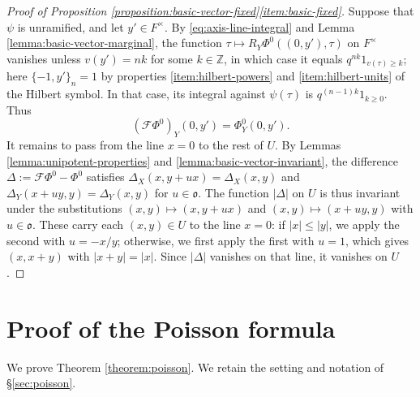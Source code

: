 \documentclass[reqno]{amsart}
\theoremstyle{plain}
\theoremstyle{definition}
\theoremstyle{itplain}
\numberwithin{equation}{section}
\numberwithin{theorem}{section}
\begin{document}
\begin{proof}[Proof of Proposition \ref{proposition:basic-vector-fixed}\eqref{item:basic-fixed}]
  Suppose that $\psi$ is unramified, and let $y' \in F^\times$.  By \eqref{eq:axis-line-integral} and Lemma \ref{lemma:basic-vector-marginal}, the function $\tau \mapsto R_Y \Phi^0((0, y'), \tau)$ on $F^\times$ vanishes unless $v(y') = n k$ for some $k \in \mathbb{Z}$, in which case it equals $q^{n k} 1_{v(\tau) \geq k}$; here $\{-1, y'\}_n = 1$ by properties \eqref{item:hilbert-powers} and \eqref{item:hilbert-units} of the Hilbert symbol.  In that case, its integral against $\psi(\tau)$ is $q^{(n-1) k} 1_{k \geq 0}$.  Thus
  \begin{equation*}
    (\mathcal{F} \Phi^0)_Y(0, y') = \Phi^0_Y(0, y').
  \end{equation*}
  It remains to pass from the line $x = 0$ to the rest of $U$.  By Lemmas \ref{lemma:unipotent-properties} and \ref{lemma:basic-vector-invariant}, the difference $\Delta := \mathcal{F} \Phi^0 - \Phi^0$ satisfies $\Delta_X(x, y + u x) = \Delta_X(x, y)$ and $\Delta_Y(x + u y, y) = \Delta_Y(x, y)$ for $u \in \mathfrak{o}$.  The function $\lvert \Delta \rvert$ on $U$ is thus invariant under the substitutions $(x, y) \mapsto (x, y + u x)$ and $(x, y) \mapsto (x + u y, y)$ with $u \in \mathfrak{o}$.  These carry each $(x, y) \in U$ to the line $x = 0$: if $\lvert x \rvert \leq \lvert y \rvert$, we apply the second with $u = - x / y$; otherwise, we first apply the first with $u = 1$, which gives $(x, x + y)$ with $\lvert x + y \rvert = \lvert x \rvert$.  Since $\lvert \Delta \rvert$ vanishes on that line, it vanishes on $U$.
\end{proof}

\section{Proof of the Poisson formula}\label{sec:proof-poisson}
We prove Theorem \ref{theorem:poisson}.  We retain the setting and notation of \S\ref{sec:poisson}.
\end{document}
